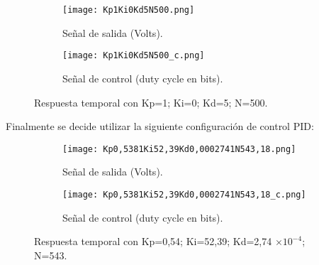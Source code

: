 \begin{figure}[H]
    \centering

    \begin{subfigure}[b]{0.49\textwidth}
        \centering
        \texttt{[image: Kp1Ki0Kd5N500.png]}
        \caption{Señal de salida (Volts).}
        \label{fig:pid_kdalto_salida}
    \end{subfigure}
    \begin{subfigure}[b]{0.49\textwidth}
        \centering
        \texttt{[image: Kp1Ki0Kd5N500\_c.png]}
        \caption{Señal de control (duty cycle en bits).}
        \label{fig:pid_kdalto_control}
    \end{subfigure}

    \vspace{-0.25cm}
    \caption{Respuesta temporal con Kp=1; Ki=0; Kd=5; N=500.\protect \footnotemark}
    \label{fig:pid_kdalto}
\end{figure}
\vspace{-0.5cm}


Finalmente se decide utilizar la siguiente configuración de control PID:

\begin{figure}[H]
    \centering

    \begin{subfigure}[b]{0.49\textwidth}
        \centering
        \texttt{[image: Kp0,5381Ki52,39Kd0,0002741N543,18.png]}
        \caption{Señal de salida (Volts).}
        \label{fig:pid_final_salida}
    \end{subfigure}
    \begin{subfigure}[b]{0.49\textwidth}
        \centering
        \texttt{[image: Kp0,5381Ki52,39Kd0,0002741N543,18\_c.png]}
        \caption{Señal de control (duty cycle en bits).}
        \label{fig:pid_final_control}
    \end{subfigure}

    \vspace{-0.25cm}
    \caption{Respuesta temporal con Kp=0,54; Ki=52,39; Kd=2,74 $\times 10^{-4}$; N=543.}
    \label{fig:pid_final}
\end{figure}
\vspace{-0.5cm}